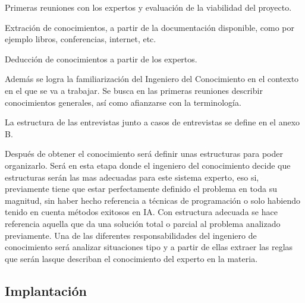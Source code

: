 \begin{compactitem}
  \item Primeras reuniones con los expertos y evaluación de la viabilidad del proyecto.
  \item Extración de conocimientos, a partir de la documentación disponible, como
     por ejemplo libros, conferencias, internet, etc.
  \item Deducción de conocimientos a partir de los expertos.
\end{compactitem}

Además se logra la familiarización del Ingeniero del Conocimiento en el contexto en
 el que se va a trabajar. Se busca en las primeras reuniones describir conocimientos
 generales, así como afianzarse con la terminología.

La estructura de las entrevistas junto a casos de entrevistas se define en el anexo B.

Después de obtener el conocimiento será definir unas estructuras para poder organizarlo.
 Será en esta etapa donde el ingeniero del conocimiento decide que estructuras serán
 las mas adecuadas para este sistema experto, eso si, previamente tiene que estar perfectamente
 definido el problema en toda su magnitud, sin haber hecho referencia a técnicas de programación
 o solo habiendo tenido en cuenta métodos exitosos en IA. Con estructura adecuada se hace referencia
 aquella que da una solución total o parcial al problema analizado previamente. Una de las
 diferentes responsabilidades del ingeniero de conocimiento será analizar situaciones tipo y
 a partir de ellas extraer las reglas que serán lasque describan el conocimiento del experto
 en la materia.



\subsection{Implantación}

